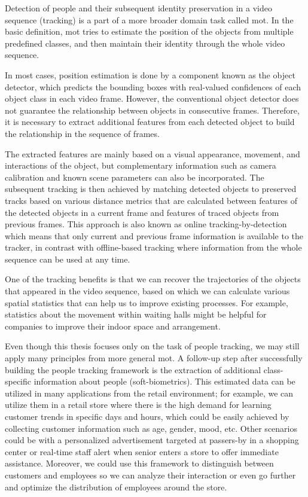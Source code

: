 \begin{introduction}
    Detection of people and their subsequent identity preservation in a video sequence (tracking) is a part of a more broader domain task called \gls{mot}. In the basic definition, \gls{mot} tries to estimate the position of the objects from multiple predefined classes, and then maintain their identity through the whole video sequence. 
    
    In most cases, position estimation is done by a component known as the object detector, which predicts the bounding boxes with real-valued confidences of each object class in each video frame. However, the conventional object detector does not guarantee the relationship between objects in consecutive frames. Therefore, it is necessary to extract additional features from each detected object to build the relationship in the sequence of frames. 
    
    The extracted features are mainly based on a visual appearance, movement, and interactions of the object, but complementary information such as camera calibration and known scene parameters can also be incorporated. The subsequent tracking is then achieved by matching detected objects to preserved tracks based on various distance metrics that are calculated between features of the detected objects in a current frame and features of traced objects from previous frames. This approach is also known as online tracking-by-detection which means that only current and previous frame information is available to the tracker, in contrast with offline-based tracking where information from the whole sequence can be used at any time. 
    
    One of the tracking benefits is that we can recover the trajectories of the objects that appeared in the video sequence, based on which we can calculate various spatial statistics that can help us to improve existing processes. For example, statistics about the movement within waiting halls might be helpful for companies to improve their indoor space and arrangement. 
    
    Even though this thesis focuses only on the task of people tracking, we may still apply many principles from more general \gls{mot}. A follow-up step after successfully building the people tracking framework is the extraction of additional class-specific information about people (soft-biometrics). This estimated data can be utilized in many applications from the retail environment; for example, we can utilize them in a retail store where there is the high demand for learning customer trends in specific days and hours, which could be easily achieved by collecting customer information such as age, gender, mood, etc. Other scenarios could be with a personalized advertisement targeted at passers-by in a shopping center or real-time staff alert when senior enters a store to offer immediate assistance. Moreover, we could use this framework to distinguish between customers and employees so we can analyze their interaction or even go further and optimize the distribution of employees around the store.
    

\end{introduction}
